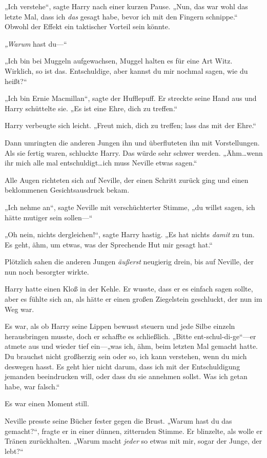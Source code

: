 {„Ich verstehe“, sagte Harry nach einer kurzen Pause. „Nun, das war wohl das letzte Mal, dass ich \emph{das} gesagt habe, bevor ich mit den Fingern schnippe.“ Obwohl der Effekt ein taktischer Vorteil sein könnte.

\emph{„Warum} hast du—“

„Ich bin bei Muggeln aufgewachsen, Muggel halten es für eine Art Witz. Wirklich, so ist das. Entschuldige, aber kannst du mir nochmal sagen, wie du heißt?“

„Ich bin Ernie Macmillan“, sagte der Hufflepuff. Er streckte seine Hand aus und Harry schüttelte sie. „Es ist eine Ehre, dich zu treffen.“

Harry verbeugte sich leicht. „Freut mich, dich zu treffen; lass das mit der Ehre.“

Dann umringten die anderen Jungen ihn und überfluteten ihn mit Vorstellungen. Als sie fertig waren, schluckte Harry. Das würde sehr schwer werden. „Ähm…wenn ihr mich alle mal entschuldigt…ich muss Neville etwas sagen.“

Alle Augen richteten sich auf Neville, der einen Schritt zurück ging und einen beklommenen Gesichtsausdruck bekam.

„Ich nehme an“, sagte Neville mit verschüchterter Stimme, „du willst sagen, ich hätte mutiger sein sollen—“

„Oh nein, nichts dergleichen!“, sagte Harry hastig. „Es hat nichts \emph{damit} zu tun. Es geht, ähm, um etwas, was der Sprechende Hut mir gesagt hat.“

Plötzlich sahen die anderen Jungen \emph{äußerst} neugierig drein, bis auf Neville, der nun noch besorgter wirkte.

Harry hatte einen Kloß in der Kehle. Er wusste, dass er es einfach sagen sollte, aber es fühlte sich an, als hätte er einen großen Ziegelstein geschluckt, der nun im Weg war.

Es war, als ob Harry seine Lippen bewusst steuern und jede Silbe einzeln herausbringen musste, doch er schaffte es schließlich. „Bitte ent-schul-di-ge“—er atmete aus und wieder tief ein—„was ich, ähm, beim letzten Mal gemacht hatte. Du brauchst nicht großherzig sein oder so, ich kann verstehen, wenn du mich deswegen hasst. Es geht hier nicht darum, dass ich mit der Entschuldigung jemanden beeindrucken will, oder dass du sie annehmen sollst. Was ich getan habe, war falsch.“

Es war einen Moment still.

Neville presste seine Bücher fester gegen die Brust. „Warum hast du das gemacht?“, fragte er in einer dünnen, zitternden Stimme. Er blinzelte, als wolle er Tränen zurückhalten. „Warum macht \emph{jeder} so etwas mit mir, sogar der Junge, der lebt?“

}
